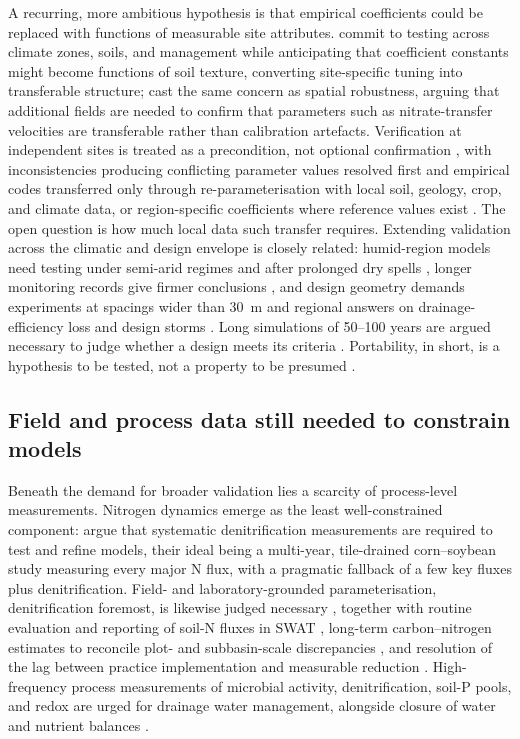 A recurring, more ambitious hypothesis is that empirical coefficients could be
replaced with functions of measurable site attributes. \textcite{Li2006} commit
to testing across climate zones, soils, and management while anticipating that
coefficient constants might become functions of soil texture, converting
site-specific tuning into transferable structure; \textcite{Chelil2022} cast the
same concern as spatial robustness, arguing that additional fields are needed to
confirm that parameters such as nitrate-transfer velocities are transferable
rather than calibration artefacts. Verification at independent sites is treated
as a precondition, not optional confirmation
\parencite{Azevedo1997,Qi2015,Kalita1998,Sadhukhan2019b}, with inconsistencies
producing conflicting parameter values resolved first \parencite{Dar2022} and
empirical codes transferred only through re-parameterisation with local soil,
geology, crop, and climate data, or region-specific coefficients where reference
values exist \parencite{Azevedo1997,FathAllah2025,Rijal2013}. The open question
is how much local data such transfer requires. Extending validation across the
climatic and design envelope is closely related: humid-region models need
testing under semi-arid regimes and after prolonged dry spells
\parencite{Prasher1996}, longer monitoring records give firmer conclusions
\parencite{Ebrahimian2011,Grazhdani1996}, and design geometry demands
experiments at spacings wider than 30~m and regional answers on
drainage-efficiency loss and design storms
\parencite{Mathew2001,Wiskow2003,MULLER1988}. Long simulations of 50--100 years
are argued necessary to judge whether a design meets its criteria
\parencite{Mendez2004,Wang2006b,Ale2009,Häggblom2019}. Portability, in short, is
a hypothesis to be tested, not a property to be presumed
\parencite{Hornbuckle2012,Shipitalo2016,Yousfi2014}.

\subsection{Field and process data still needed to constrain models}

Beneath the demand for broader validation lies a scarcity of process-level
measurements. Nitrogen dynamics emerge as the least well-constrained component:
\textcite{David2009} argue that systematic denitrification measurements are
required to test and refine models, their ideal being a multi-year,
tile-drained corn--soybean study measuring every major N flux, with a pragmatic
fallback of a few key fluxes plus denitrification. Field- and
laboratory-grounded parameterisation, denitrification foremost, is likewise
judged necessary \parencite{Salazar2009}, together with routine evaluation and
reporting of soil-N fluxes in SWAT \parencite{Ikenberry2017}, long-term
carbon--nitrogen estimates to reconcile plot- and subbasin-scale discrepancies
\parencite{Singer2011}, and resolution of the lag between practice
implementation and measurable reduction \parencite{Law2022,Tao2021}.
High-frequency process measurements of microbial activity, denitrification,
soil-P pools, and redox are urged for drainage water management, alongside
closure of water and nutrient balances \parencite{Frankenberger2024,Sharpley2019}.

